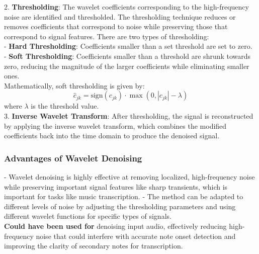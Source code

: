 \documentclass{article}
\begin{document}
2. \textbf{Thresholding}: The wavelet coefficients corresponding to the high-frequency noise are identified and thresholded. The thresholding technique reduces or removes coefficients that correspond to noise while preserving those that correspond to signal features. There are two types of thresholding: \\
   - \textbf{Hard Thresholding}: Coefficients smaller than a set threshold are set to zero. \\
   - \textbf{Soft Thresholding}: Coefficients smaller than a threshold are shrunk towards zero, reducing the magnitude of the larger coefficients while eliminating smaller ones. \\

   Mathematically, soft thresholding is given by:
   \[
   \hat{c}_{jk} = \text{sign}(c_{jk}) \cdot \max(0, |c_{jk}| - \lambda)
   \]
   where \( \lambda \) is the threshold value. \\

3. \textbf{Inverse Wavelet Transform}: After thresholding, the signal is reconstructed by applying the inverse wavelet transform, which combines the modified coefficients back into the time domain to produce the denoised signal.

\subsubsection{Advantages of Wavelet Denoising}
- Wavelet denoising is highly effective at removing localized, high-frequency noise while preserving important signal features like sharp transients, which is important for tasks like music transcription.
- The method can be adapted to different levels of noise by adjusting the thresholding parameters and using different wavelet functions for specific types of signals. \\

\textbf{Could have been used for} denoising input audio, effectively reducing high-frequency noise that could interfere with accurate note onset detection and improving the clarity of secondary notes for transcription.
\end{document}

